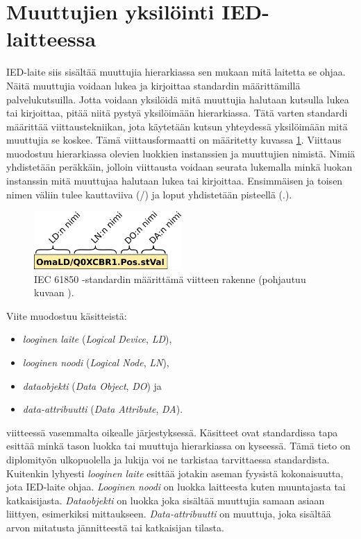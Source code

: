 \section{Muuttujien yksilöinti IED-laitteessa}
IED-laite siis sisältää muuttujia hierarkiassa sen mukaan mitä laitetta se ohjaa. Näitä muuttujia voidaan lukea ja kirjoittaa standardin määrittämillä palvelukutsuilla. Jotta voidaan yksilöidä mitä muuttujia halutaan kutsulla lukea tai kirjoittaa, pitää niitä pystyä yksilöimään hierarkiassa. Tätä varten standardi määrittää viittaustekniikan, jota käytetään kutsun yhteydessä yksilöimään mitä muuttujia se koskee. Tämä viittausformaatti on määritetty kuvassa \ref{fig:iec61850-data-reference}. Viittaus muodostuu hierarkiassa olevien luokkien instanssien ja muuttujien nimistä. Nimiä yhdistetään peräkkäin, jolloin viittausta voidaan seurata lukemalla minkä luokan instanssin mitä muuttujaa halutaan lukea tai kirjoittaa. Ensimmäisen ja toisen nimen väliin tulee kauttaviiva (/) ja loput yhdistetään pisteellä (.). \mbox{\cite[s.~625--626]{Mackiewicz2006}} \mbox{\cite[s.~93--95]{IEC61850-7-1}}

\begin{figure}[ht!]
	\includegraphics[width=0.5\textwidth]{pictures/iec61850-data-reference.png}
	\caption{IEC 61850 -standardin määrittämä viitteen rakenne (pohjautuu kuvaan \mbox{\cite[s.~93]{IEC61850-7-1}}).}
	\label{fig:iec61850-data-reference}
\end{figure}

Viite muodostuu käsitteistä:
\begin{itemize}
	\item \emph{looginen laite} (\emph{Logical Device}, \emph{LD}),
	\item \emph{looginen noodi} (\emph{Logical Node}, \emph{LN}),
	\item \emph{dataobjekti} (\emph{Data Object}, \emph{DO}) ja
	\item \emph{data-attribuutti} (\emph{Data Attribute}, \emph{DA}).
\end{itemize}
viitteessä vasemmalta oikealle järjestyksessä. Käsitteet ovat standardissa tapa esittää minkä tason luokka tai muuttuja hierarkiassa on kyseessä. Tämä tieto on diplomityön ulkopuolella ja lukija voi ne tarkistaa tarvittaessa standardista. Kuitenkin lyhyesti \emph{looginen laite} esittää jotakin aseman fyysistä kokonaisuutta, jota IED-laite ohjaa. \emph{Looginen noodi} on luokka laitteesta kuten muuntajasta tai katkaisijasta. \emph{Dataobjekti} on luokka joka sisältää muuttujia samaan asiaan liittyen, esimerkiksi mittaukseen. \emph{Data-attribuutti} on muuttuja, joka sisältää arvon mitatusta jännitteestä tai katkaisijan tilasta. \mbox{\cite[s.~2]{Camachi2017}} \mbox{\cite[s.~24]{IEC61850-1}}


